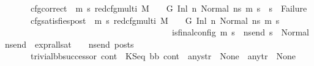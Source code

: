 \begin{isabellebody}
\ \ \ \ \ \ \ cfg{\isacharunderscore}{\kern0pt}correct{\isacharcolon}{\kern0pt}\ {\isachardoublequoteopen}{\isacharparenleft}{\kern0pt}{\isasymAnd}\ m{}\ s{}{\isachardot}{\kern0pt}\ {\isacharparenleft}{\kern0pt}{\isacharparenleft}{\kern0pt}red{\isacharunderscore}{\kern0pt}cfg{\isacharunderscore}{\kern0pt}multi\ M\ {\isasymLambda}\ {\isasymGamma}\ {\isasymOmega}\ G\ {\isacharparenleft}{\kern0pt}Inl\ n{\isacharcomma}{\kern0pt}\ Normal\ ns{}{\isacharparenright}{\kern0pt}\ {\isacharparenleft}{\kern0pt}m{}{\isacharcomma}{\kern0pt}\ s{}{\isacharparenright}{\kern0pt}{\isacharparenright}{\kern0pt}\ {\isasymLongrightarrow}\ {\isacharparenleft}{\kern0pt}s{}\ {\isasymnoteq}\ Failure{\isacharparenright}{\kern0pt}{\isacharparenright}{\kern0pt}{\isacharparenright}{\kern0pt}{\isachardoublequoteclose}\isanewline
\ \ \ \ \ \ \ cfg{\isacharunderscore}{\kern0pt}satisfies{\isacharunderscore}{\kern0pt}post{\isacharcolon}{\kern0pt}\ {\isachardoublequoteopen}{\isacharparenleft}{\kern0pt}{\isasymAnd}\ m{}\ s{}{\isachardot}{\kern0pt}\ {\isacharparenleft}{\kern0pt}red{\isacharunderscore}{\kern0pt}cfg{\isacharunderscore}{\kern0pt}multi\ M\ {\isasymLambda}\ {\isasymGamma}\ {\isasymOmega}\ G\ {\isacharparenleft}{\kern0pt}Inl\ n{\isacharcomma}{\kern0pt}\ Normal\ ns{}{\isacharparenright}{\kern0pt}\ {\isacharparenleft}{\kern0pt}m{}{\isacharcomma}{\kern0pt}\ s{}{\isacharparenright}{\kern0pt}{\isacharparenright}{\kern0pt}\ {\isasymLongrightarrow}\isanewline
\ \ \ \ \ \ \ \ \ \ \ \ \ \ \ \ \ \ \ \ \ \ \ \ \ \ \ \ \ \ \ \ \ \ \ \ \ \ \ \ is{\isacharunderscore}{\kern0pt}final{\isacharunderscore}{\kern0pt}config\ {\isacharparenleft}{\kern0pt}m{}{\isacharcomma}{\kern0pt}\ s{}{\isacharparenright}{\kern0pt}\ {\isasymLongrightarrow}\ {\isasymforall}ns{\isacharunderscore}{\kern0pt}end{\isachardot}{\kern0pt}\ s{}\ {\isacharequal}{\kern0pt}\ Normal\ ns{\isacharunderscore}{\kern0pt}end\ {\isasymlongrightarrow}\ expr{\isacharunderscore}{\kern0pt}all{\isacharunderscore}{\kern0pt}sat\ {\isasymLambda}\ {\isasymGamma}\ {\isasymOmega}\ ns{\isacharunderscore}{\kern0pt}end\ posts{\isacharparenright}{\kern0pt}{\isachardoublequoteclose}\isanewline
\ \ \ \ \ \ \ trivial{\isacharunderscore}{\kern0pt}bb{\isacharunderscore}{\kern0pt}successor{\isacharcolon}{\kern0pt}\ {\isachardoublequoteopen}{\isacharparenleft}{\kern0pt}cont{}\ {\isacharequal}{\kern0pt}\ KSeq\ bb{}\ cont{}{\isacharparenright}{\kern0pt}\ {\isasymand}\ any{\isacharunderscore}{\kern0pt}str\ {\isacharequal}{\kern0pt}\ None\ {\isasymand}\ any{\isacharunderscore}{\kern0pt}tr\ {\isacharequal}{\kern0pt}\ None{\isachardoublequoteclose}\isanewline

\end{isabellebody}
